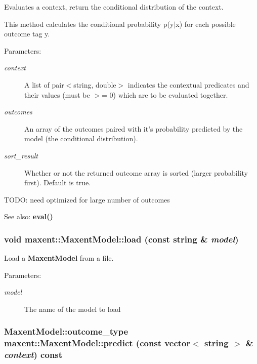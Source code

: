 Evaluates a context, return the conditional distribution of the context. 

This method calculates the conditional probability p(y$|$x) for each possible outcome tag y.

\begin{Desc}
\item[Parameters:]
\begin{description}
\item[{\em context}]A list of pair$<$string, double$>$ indicates the contextual predicates and their values (must be $>$= 0) which are to be evaluated together. \item[{\em outcomes}]An array of the outcomes paired with it's probability predicted by the model (the conditional distribution). \item[{\em sort\_\-result}]Whether or not the returned outcome array is sorted (larger probability first). Default is true.\end{description}
\end{Desc}
TODO: need optimized for large number of outcomes

\begin{Desc}
\item[See also:]{\bf eval()} \end{Desc}
\subsubsection{\setlength{\rightskip}{0pt plus 5cm}void maxent::Maxent\-Model::load (const string \& {\em model})}\label{classmaxent_1_1MaxentModel_a1}


Load a {\bf Maxent\-Model} from a file. 

\begin{Desc}
\item[Parameters:]
\begin{description}
\item[{\em model}]The name of the model to load \end{description}
\end{Desc}
\subsubsection{\setlength{\rightskip}{0pt plus 5cm}Maxent\-Model::outcome\_\-type maxent::Maxent\-Model::predict (const vector$<$ string $>$ \& {\em context}) const}\label{classmaxent_1_1MaxentModel_a13}


